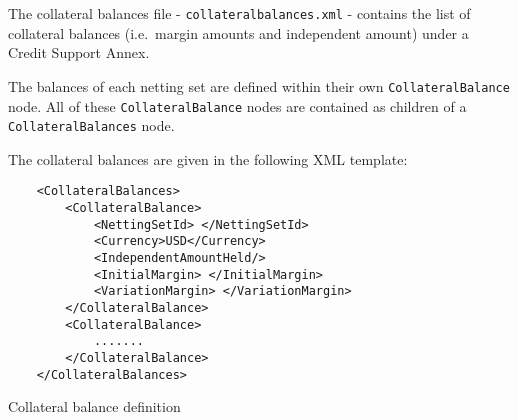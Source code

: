 \ifdefined\UserGuidePlus\newcommand{\cbsection}{\subsection}\fi
\ifdefined\UserGuidePlus\newcommand{\cbsubsection}{\subsubsection}\fi
\ifdefined\RiskCatalogue\newcommand{\cbsection}{\section}\fi
\ifdefined\RiskCatalogue\newcommand{\cbsubsection}{\subsection}\fi
\label{sec:collateralbalances}

The collateral balances file - {\tt collateralbalances.xml} - 
contains the list of collateral balances (i.e.\ margin amounts
and independent amount) under a Credit Support Annex.

\vspace{1em}

The balances of each netting set are defined within their own
\lstinline!CollateralBalance! node. All of these
\lstinline!CollateralBalance! nodes are contained as children
of a \lstinline!CollateralBalances! node.

\vspace{1em}

The collateral balances are given in the following XML template:

\begin{listing}[H]
\begin{verbatim}
    <CollateralBalances>
        <CollateralBalance>
            <NettingSetId> </NettingSetId>
            <Currency>USD</Currency>
            <IndependentAmountHeld/>
            <InitialMargin> </InitialMargin>
            <VariationMargin> </VariationMargin>
        </CollateralBalance>
        <CollateralBalance>
            .......
        </CollateralBalance>
    </CollateralBalances>
\end{verbatim}
\caption{Collateral balance definition}
\label{lst:collateralbalances}
\end{listing}

